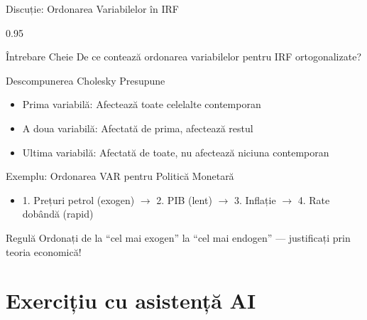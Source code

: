 \documentclass[9pt, aspectratio=169, t]{beamer}
\begin{document}
\begin{frame}{Discuție: Ordonarea Variabilelor în IRF}
    \begin{cminipage}{0.95\textwidth}
    {\small
    \begin{alertblock}{Întrebare Cheie}
        De ce contează ordonarea variabilelor pentru IRF ortogonalizate?
    \end{alertblock}
    \begin{block}{Descompunerea Cholesky Presupune}
        \begin{itemize}\setlength{\itemsep}{0pt}
            \item Prima variabilă: Afectează toate celelalte contemporan
            \item A doua variabilă: Afectată de prima, afectează restul
            \item Ultima variabilă: Afectată de toate, nu afectează niciuna contemporan
        \end{itemize}
    \end{block}
    \begin{exampleblock}{Exemplu: Ordonarea VAR pentru Politică Monetară}
        \begin{itemize}\setlength{\itemsep}{0pt}
            \item 1. Prețuri petrol (exogen) $\to$ 2. PIB (lent) $\to$ 3. Inflație $\to$ 4. Rate dobândă (rapid)
        \end{itemize}
    \end{exampleblock}
    \begin{block}{Regulă}
        Ordonați de la ``cel mai exogen'' la ``cel mai endogen'' --- justificați prin teoria economică!
    \end{block}
    }
    \end{cminipage}
\end{frame}

\section{Exercițiu cu asistență AI}
\end{document}
